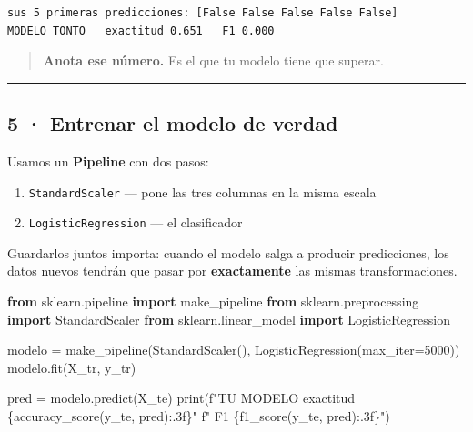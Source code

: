 \documentclass[
]{article}
\newenvironment{Shaded}{}{}
\newcommand{\BuiltInTok}[1]{\textcolor[rgb]{0.00,0.50,0.00}{#1}}
\newcommand{\DecValTok}[1]{\textcolor[rgb]{0.25,0.63,0.44}{#1}}
\newcommand{\ImportTok}[1]{\textcolor[rgb]{0.00,0.50,0.00}{\textbf{#1}}}
\newcommand{\NormalTok}[1]{#1}
\newcommand{\OperatorTok}[1]{\textcolor[rgb]{0.40,0.40,0.40}{#1}}
\newcommand{\SpecialCharTok}[1]{\textcolor[rgb]{0.25,0.44,0.63}{#1}}
\newcommand{\SpecialStringTok}[1]{\textcolor[rgb]{0.73,0.40,0.53}{#1}}
\providecommand{\tightlist}{%
  \setlength{\itemsep}{0pt}\setlength{\parskip}{0pt}}
\begin{document}
\begin{verbatim}
sus 5 primeras predicciones: [False False False False False]
MODELO TONTO   exactitud 0.651   F1 0.000
\end{verbatim}

\protect{}\label{4ATkp7rpnYyU}
\begin{quote}
\textbf{Anota ese número.} Es el que tu modelo tiene que superar.
\end{quote}

\protect{}\label{G4sSjVFsnYyU}
\begin{center}\rule{0.5\linewidth}{0.5pt}\end{center}

\subsection{5 · Entrenar el modelo de
verdad}\label{5--entrenar-el-modelo-de-verdad}

Usamos un \textbf{Pipeline} con dos pasos:

\begin{enumerate}
\tightlist
\item
  \texttt{StandardScaler} --- pone las tres columnas en la misma escala
\item
  \texttt{LogisticRegression} --- el clasificador
\end{enumerate}

Guardarlos juntos importa: cuando el modelo salga a producir
predicciones, los datos nuevos tendrán que pasar por
\textbf{exactamente} las mismas transformaciones.

\protect{}\label{9-rFH6SAnYyV}
\begin{Shaded}
\begin{Highlighting}[]
\ImportTok{from}\NormalTok{ sklearn.pipeline }\ImportTok{import}\NormalTok{ make\_pipeline}
\ImportTok{from}\NormalTok{ sklearn.preprocessing }\ImportTok{import}\NormalTok{ StandardScaler}
\ImportTok{from}\NormalTok{ sklearn.linear\_model }\ImportTok{import}\NormalTok{ LogisticRegression}

\NormalTok{modelo }\OperatorTok{=}\NormalTok{ make\_pipeline(StandardScaler(), LogisticRegression(max\_iter}\OperatorTok{=}\DecValTok{5000}\NormalTok{))}
\NormalTok{modelo.fit(X\_tr, y\_tr)}

\NormalTok{pred }\OperatorTok{=}\NormalTok{ modelo.predict(X\_te)}
\BuiltInTok{print}\NormalTok{(}\SpecialStringTok{f"TU MODELO      exactitud }\SpecialCharTok{\{}\NormalTok{accuracy\_score(y\_te, pred)}\SpecialCharTok{:.3f\}}\SpecialStringTok{"}
      \SpecialStringTok{f"   F1 }\SpecialCharTok{\{}\NormalTok{f1\_score(y\_te, pred)}\SpecialCharTok{:.3f\}}\SpecialStringTok{"}\NormalTok{)}
\end{Highlighting}
\end{Shaded}
\end{document}
